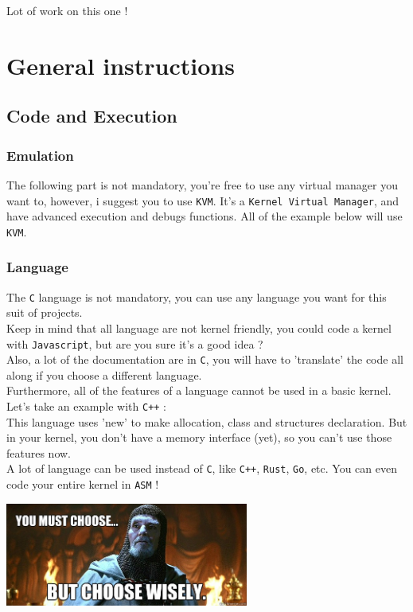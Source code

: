 \documentclass{42-en}
\begin{document}
	Lot of work on this one !

\newpage
\chapter{General instructions}
	\section{Code and Execution}
		\subsection{Emulation}
		The following part is not mandatory, you're free to use any virtual
		manager you want to, however, i suggest you to use \texttt{KVM}.
		It's a \texttt{Kernel Virtual Manager}, and have advanced execution
		and debugs functions.
		All of the example below will use \texttt{KVM}.
		\subsection{Language}
			The \texttt{C} language is not mandatory, you can use any language
			you want for this suit of projects.\\
			Keep in mind that all language are not kernel friendly, you could
			code a kernel with \texttt{Javascript}, but are you sure
			it's a good idea ?\\ Also, a lot of the documentation are
			in \texttt{C}, you will have to 'translate' the code all along
			if you choose a different language.\\

			Furthermore, all of the features of a language cannot be used in a
			basic kernel. Let's take an example with \texttt{C++} :\\
			This language uses 'new' to make allocation, class and structures
			declaration. But in your kernel, you don't have a memory interface
			(yet), so you can't use those features now.\\

			A lot of language can be used instead of \texttt{C},
			like \texttt{C++}, \texttt{Rust}, \texttt{Go}, etc.
			You can even code your entire kernel in \texttt{ASM} !\\
			\begin{center}
			  \includegraphics[width=8cm]{choose.jpg}
			\end{center}
\end{document}
